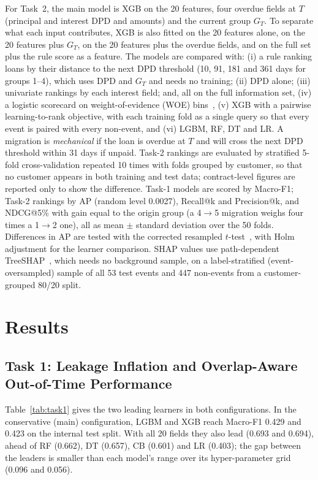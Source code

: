 \documentclass[runningheads]{llncs}
\begin{document}
For Task~2, the main model is XGB on the 20 features, four overdue fields at $T$ (principal and interest DPD and amounts) and the current group $G_T$. To separate what each input contributes, XGB is also fitted on the 20 features alone, on the 20 features plus $G_T$, on the 20 features plus the overdue fields, and on the full set plus the rule score as a feature. The models are compared with: (i) a rule ranking loans by their distance to the next DPD threshold (10, 91, 181 and 361 days for groups 1--4), which uses DPD and $G_T$ and needs no training; (ii) DPD alone; (iii) univariate rankings by each interest field; and, all on the full information set, (iv) a logistic scorecard on weight-of-evidence (WOE) bins~\cite{siddiqi2006credit}, (v) XGB with a pairwise learning-to-rank objective, with each training fold as a single query so that every event is paired with every non-event, and (vi) LGBM, RF, DT and LR. A migration is \emph{mechanical} if the loan is overdue at $T$ and will cross the next DPD threshold within 31 days if unpaid. Task-2 rankings are evaluated by stratified 5-fold cross-validation repeated 10 times with folds grouped by customer, so that no customer appears in both training and test data; contract-level figures are reported only to show the difference. Task-1 models are scored by Macro-F1; Task-2 rankings by AP (random level 0.0027), Recall@k and Precision@k, and NDCG@5\% with gain equal to the origin group (a 4$\to$5 migration weighs four times a 1$\to$2 one), all as mean $\pm$ standard deviation over the 50 folds. Differences in AP are tested with the corrected resampled $t$-test~\cite{nadeau2003inference}, with Holm adjustment for the learner comparison. SHAP values use path-dependent TreeSHAP~\cite{lundberg2020tree}, which needs no background sample, on a label-stratified (event-oversampled) sample of all 53 test events and 447 non-events from a customer-grouped 80/20 split.


\section{Results}
\label{sec:results}

\subsection{Task 1: Leakage Inflation and Overlap-Aware Out-of-Time Performance}

Table~\ref{tab:task1} gives the two leading learners in both configurations. In the conservative (main) configuration, LGBM and XGB reach Macro-F1 0.429 and 0.423 on the internal test split. With all 20 fields they also lead (0.693 and 0.694), ahead of RF (0.662), DT (0.657), CB (0.601) and LR (0.403); the gap between the leaders is smaller than each model's range over its hyper-parameter grid (0.096 and 0.056).
\end{document}
